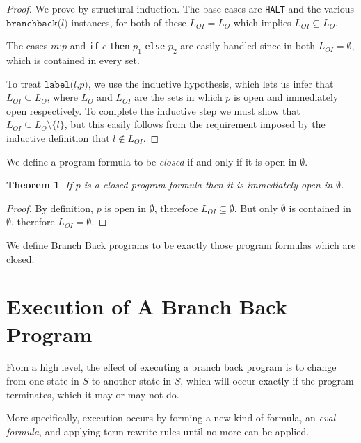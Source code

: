 \documentclass[11pt]{article}
\begin{document}
\begin{proof}
We prove by structural induction.  The base cases are \texttt{HALT} and the various $\texttt{branchback(}l\texttt{)}$ instances, for both of these $L_{OI} = L_{O}$ which implies $L_{OI} \subseteq L_{O}$.

The cases $m\texttt{;}p$ and \texttt{if} $c$ \texttt{then} $p_{1}$ \texttt{else} $p_{2}$ are easily handled since in both $L_{OI} = \emptyset$, which is contained in every set.

To treat $\texttt{label(}l\texttt{,} p\texttt{)}$, we use the inductive hypothesis, which lets us infer that $L_{OI} \subseteq L_{O}$, where $L_{O}$ and $L_{OI}$ are the sets in which $p$ is open and immediately open respectively.  To complete the inductive step we must show that $L_{OI} \subseteq L_{O} \setminus \{l\}$, but this easily follows from the requirement imposed by the inductive definition that $l \notin L_{OI}$.
\end{proof}

We define a program formula to be \emph{closed} if and only if it is open in $\emptyset$.

\newtheorem*{closedimmedopeninempty}{Theorem}
\begin{closedimmedopeninempty}
If $p$ is a closed program formula then it is immediately open in $\emptyset$.
\end{closedimmedopeninempty}

\begin{proof}
By definition, $p$ is open in $\emptyset$, therefore $L_{OI} \subseteq \emptyset$.  But only $\emptyset$ is contained in $\emptyset$, therefore $L_{OI} = \emptyset$.
\end{proof}

We define Branch Back programs to be exactly those program formulas which are closed.

\section{Execution of A Branch Back Program}

From a high level, the effect of executing a branch back program is to change from one state in $S$ to another state in $S$, which will occur exactly if the program terminates, which it may or may not do.

More specifically, execution occurs by forming a new kind of formula, an \emph{eval formula}, and applying term rewrite rules until no more can be applied.
\end{document}
